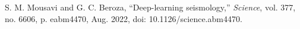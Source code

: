 \documentclass[conference]{IEEEtran}
\begin{document}
\begin{thebibliography}{00}
     S. M. Mousavi and G. C. Beroza, ``Deep-learning seismology,'' \emph{Science}, vol. 377, no. 6606, p. eabm4470, Aug. 2022, doi: 10.1126/science.abm4470.   %

\end{thebibliography}
\end{document}
